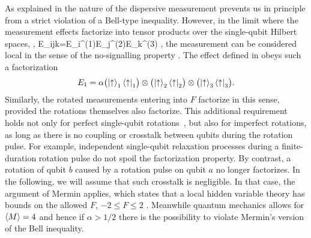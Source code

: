 As explained in  the nature of the dispersive measurement prevents us in principle from a strict violation of a Bell-type inequality. However, in the limit where the measurement effects factorize into tensor products over the single-qubit Hilbert spaces, \ie,
\be
    E_{ijk}=E_{i}^{(1)}\otimes E_{j}^{(2)}\otimes E_{k}^{(3)} ,
\ee
the measurement can be considered local in the sense of the no-signalling property
\cite{busch_luders_1998,dieks_inequalities_2002}. The effect defined in  obeys such a factorization
\begin{equation}
    E_1=\alpha \bigl(\left\lvert \uparrow \right\rangle_1\left\langle \uparrow \right\rvert_1\bigr) \otimes
        \bigl(\left\lvert \uparrow \right\rangle_2\left\langle \uparrow \right\rvert_2\bigr) \otimes
        \bigl(\left\lvert \uparrow \right\rangle_3\left\langle \uparrow \right\rvert_3\bigr) .
\end{equation}
Similarly, the rotated measurements entering into $F$ factorize in this sense, provided the rotations themselves also factorize. This additional requirement holds not only for perfect single-qubit rotations~\cite{kofman_analysis_2008}, but also for imperfect rotations, as long as there is no coupling or crosstalk between qubits during the rotation pulse. For example, independent single-qubit relaxation processes during a finite-duration rotation pulse do not spoil the factorization property. By contrast, a rotation of qubit $b$ caused by a rotation pulse on qubit $a$ no longer factorizes. In the following, we will assume that such crosstalk is negligible. In that case, the argument of Mermin applies, which states that a local hidden variable theory has%
bounds on the allowed $F$, $-2\le F\le 2$ \cite{mermin_extreme_1990}. Meanwhile quantum mechanics allows for $\langle M\rangle=4$ and hence if $\alpha>1/2$ there is the possibility to violate Mermin's version of the Bell inequality.

